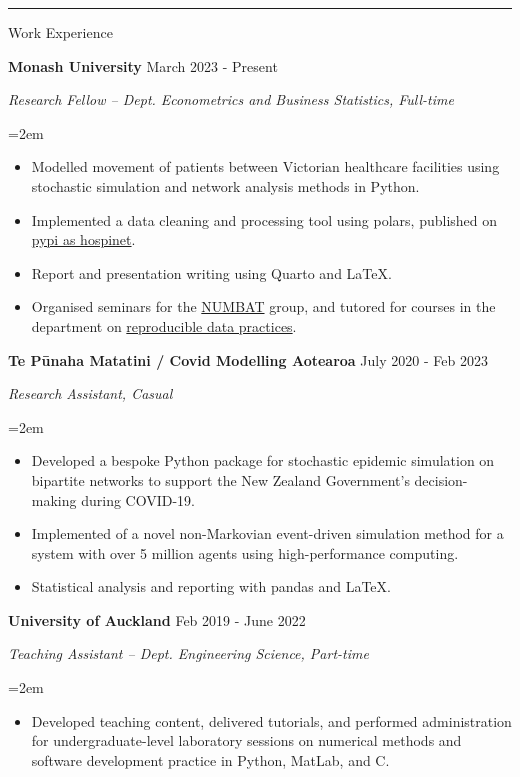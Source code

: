 \documentclass[paper=a4paper,fontsize=11pt]{scrartcl}
\newcommand{\pagerule}[1][2pt]{\noindent\rule{\textwidth}{#1}}
\newcommand{\usingfont}[2]{#1 #2 \par \normalsize \normalfont}
\newcommand{\sectionheader}[1]{\pagerule \vspace{0.05ex} \usingfont{\usefont{T1}{phv}{m}{v} \Large}{\noindent \hspace{-0.5em} #1} \vspace{0.5ex}}
\newcommand{\indented}[1][2em]{\noindent\hangindent=#1\hangafter=0}
\begin{document}
\sectionheader{Work Experience}
\noindent \textbf{Monash University} \hfill
{March 2023 - Present} \par
\noindent \textit{Research Fellow -- Dept. Econometrics and Business
Statistics, Full-time} \par
\indented \small {
    \begin{itemize}
    \setlength{\itemsep}{0ex}
        \item Modelled movement of patients between Victorian healthcare
facilities using stochastic simulation and network analysis methods in
Python.
        \item Implemented a data cleaning and processing tool using
polars, published on \href{https://pypi.org/project/hospinet}{pypi as
hospinet}.
        \item Report and presentation writing using Quarto and \LaTeX.
        \item Organised seminars for the
\href{https://numbat.space}{NUMBAT} group, and tutored for courses in
the department on
\href{https://handbook.monash.edu/2024/units/ETC5513}{reproducible data
practices}.
        \end{itemize}
}
\normalsize \par\par
\noindent \textbf{Te Pūnaha Matatini / Covid Modelling Aotearoa} \hfill
{July 2020 - Feb 2023} \par
\noindent \textit{Research Assistant, Casual} \par
\indented \small {
    \begin{itemize}
    \setlength{\itemsep}{0ex}
        \item Developed a bespoke Python package for stochastic epidemic
simulation on bipartite networks to support the New Zealand Government's
decision-making during COVID-19.
        \item Implemented of a novel non-Markovian event-driven
simulation method for a system with over 5 million agents using
high-performance computing.
        \item Statistical analysis and reporting with pandas and \LaTeX.
        \end{itemize}
}
\normalsize \par\par
\noindent \textbf{University of Auckland} \hfill
{Feb 2019 - June 2022} \par
\noindent \textit{Teaching Assistant -- Dept. Engineering
Science, Part-time} \par
\indented \small {
    \begin{itemize}
    \setlength{\itemsep}{0ex}
        \item Developed teaching content, delivered tutorials, and
performed administration for undergraduate-level laboratory sessions on
numerical methods and software development practice in Python, MatLab,
and C.
        \end{itemize}
}
\end{document}
